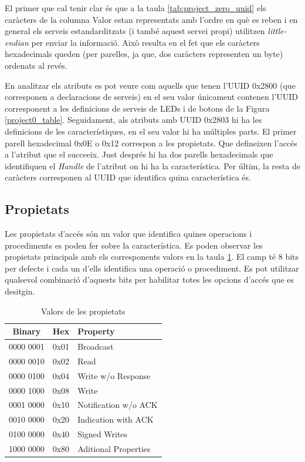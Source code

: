 El primer que cal tenir clar és que a la taula \ref{tab:project_zero_uuid} els caràcters de la columna Valor estan representats amb l'ordre en què es reben i en general els serveis estandarditzats (i també aquest servei propi) utilitzen \textit{little-endian} per enviar la informació.
Això resulta en el fet que els caràcters hexadecimals queden (per parelles, ja que, dos caràcters representen un byte) ordenats al revés.

En analitzar els atributs es pot veure com aquells que tenen l'UUID 0x2800 (que corresponen a declaracions de serveis) en el seu valor únicament contenen l'UUID corresponent a les definicions de serveis de LEDs i de botons de la Figura \ref{project0_table}.
Seguidament, als atributs amb UUID 0x2803 hi ha les definicions de les característiques, en el seu valor hi ha múltiples parts.
El primer parell hexadecimal 0x0E o 0x12 correspon a les propietats.
Que defineixen l'accés a l'atribut que el succeeix.
Just després hi ha dos parells hexadecimals que identifiquen el \textit{Handle} de l'atribut on hi ha la característica.
Per últim, la resta de caràcters corresponen al UUID que identifica quina característica és.

\subsection{Propietats}
\label{sec:properties}
Les propietats d'accés són un valor que identifica quines operacions i procediments es poden fer sobre la característica.
Es poden observar les propietats principals amb els corresponents valors en la taula \ref{properties}.
El camp té 8 bits per defecte i cada un d'ells identifica una operació o procediment.
Es pot utilitzar qualsevol combinació d'aquests bits  per habilitar totes les opcions d'accés que es desitgin.

\begin{table}[h]
	\begin{center}
		\begin{tabular}{|c|c|l|}
			\hline
			Binary	&	Hex		&	Property	\\	\hline
			0000 0001	&	0x01	&	Broadcast\\	\hline
			0000 0010	&	0x02	&	Read	\\	\hline
			0000 0100	&	0x04	&	Write w/o Response	\\	\hline
			0000 1000	&	0x08	&	Write	\\	\hline
			0001 0000	&	0x10	&	Notification w/o ACK	\\	\hline
			0010 0000	&	0x20	&	Indication with ACK	\\	\hline
			0100 0000	&	0x40	&	Signed Writes	\\	\hline
			1000 0000	&	0x80	&	Aditional Properties	\\	\hline
		\end{tabular}		
	\end{center}
\caption{Valors de les propietats}
\label{properties}
\end{table}

